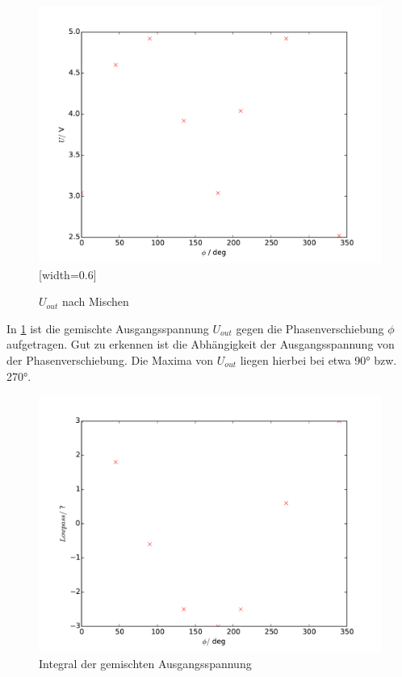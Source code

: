 \begin{figure}
  \centering
  \includegraphics{plot2u.pdf}[width=0.6\textwidth]
  \caption{$U_{out}$ nach Mischen}
  \label{fig:plot2u}
\end{figure}

In \ref{fig:plot2u} ist die gemischte Ausgangsspannung $U_{out}$ gegen die
Phasenverschiebung $\phi$ aufgetragen. Gut zu erkennen ist die Abhängigkeit
der Ausgangsspannung von der Phasenverschiebung. Die Maxima von $U_{out}$
liegen hierbei bei etwa 90° bzw. 270°.

\begin{figure}
  \centering
  \includegraphics{plot2low.pdf}
  \caption{Integral der gemischten Ausgangsspannung}
  \label{fig:plot2low}
\end{figure}

